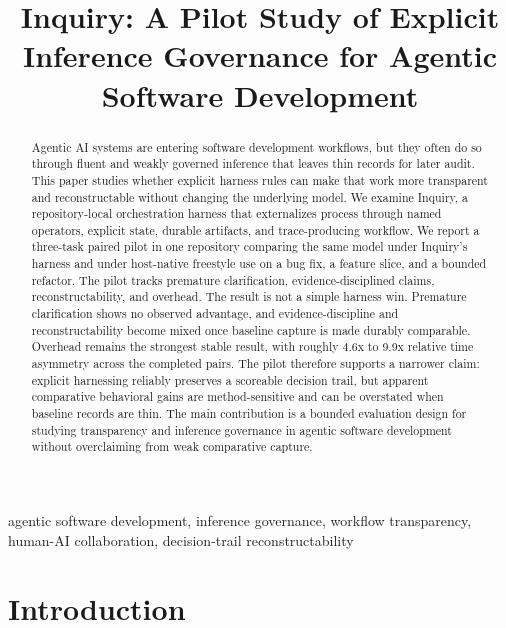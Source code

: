 \documentclass[conference]{IEEEtran}
\title{Inquiry: A Pilot Study of Explicit Inference Governance for Agentic Software Development}
\author{%
\IEEEauthorblockN{Cristian Cisneros}
\IEEEauthorblockA{%
Independent Researcher \\
Piura, Peru \\
ccisnedev@gmail.com%
}
}
\begin{document}
\maketitle

\begin{abstract}
Agentic AI systems are entering software development workflows, but they often do so
through fluent and weakly governed inference that leaves thin records for later audit.
This paper studies whether explicit harness rules can make that work more transparent
and reconstructable without changing the underlying model. We examine Inquiry, a
repository-local orchestration harness that externalizes process through named
operators, explicit state, durable artifacts, and trace-producing workflow. We report a
three-task paired pilot in one repository comparing the same model under Inquiry's
harness and under host-native freestyle use on a bug fix, a feature slice, and a
bounded refactor. The pilot tracks premature clarification, evidence-disciplined
claims, reconstructability, and overhead. The result is not a simple harness win.
Premature clarification shows no observed advantage, and evidence-discipline and
reconstructability become mixed once baseline capture is made durably comparable.
Overhead remains the strongest stable result, with roughly 4.6x to 9.9x relative time
asymmetry across the completed pairs. The pilot therefore supports a narrower claim:
explicit harnessing reliably preserves a scoreable decision trail, but apparent
comparative behavioral gains are method-sensitive and can be overstated when baseline
records are thin. The main contribution is a bounded evaluation design for studying
transparency and inference governance in agentic software development without
overclaiming from weak comparative capture.
\end{abstract}

\begin{IEEEkeywords}
agentic software development, inference governance, workflow transparency,
human-AI collaboration, decision-trail reconstructability
\end{IEEEkeywords}

\section{Introduction}
\end{document}
